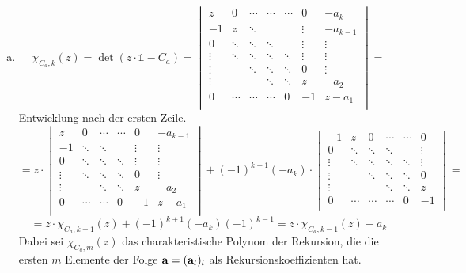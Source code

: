 \begin{enumerate}[(a)]
\item
	\[ \chi_{C_a, k}(z) = \det ( z\cdot \mathds{1} - C_a) = 
		\begin{vmatrix}
			z      & 0      & \cdots & \cdots & \cdots & 0      & -a_k     \\
			-1     & z      & \ddots &        &        & \vdots & -a_{k-1} \\
			0      & \ddots & \ddots & \ddots &        & \vdots & \vdots   \\
			\vdots & \ddots & \ddots & \ddots & \ddots & \vdots & \vdots   \\
			\vdots &        & \ddots & \ddots & \ddots & 0      & \vdots   \\
			\vdots &        &        & \ddots & \ddots & z      & -a_2     \\
			0      & \cdots & \cdots & \cdots & 0      & -1     & z - a_1  \\
		\end{vmatrix} = \]
	Entwicklung nach der ersten Zeile.
	\[ = z \cdot \begin{vmatrix}
			z      & 0      & \cdots & \cdots & 0      & -a_{k-1} \\
			-1     & \ddots & \ddots &        & \vdots & \vdots   \\
			0      & \ddots & \ddots & \ddots & \vdots & \vdots   \\
			\vdots & \ddots & \ddots & \ddots & 0      & \vdots   \\
			\vdots &        & \ddots & \ddots & z      & -a_2     \\
			0      & \cdots & \cdots & 0      & -1     & z - a_1  \\
		\end{vmatrix} + (-1)^{k+1}(-a_k) \cdot
		\begin{vmatrix}
			-1     & z      & 0      & \cdots & \cdots & 0      \\
			0      & \ddots & \ddots & \ddots &        & \vdots \\
			\vdots & \ddots & \ddots & \ddots & \ddots & \vdots \\
			\vdots &        & \ddots & \ddots & \ddots & 0      \\
			\vdots &        &        & \ddots & \ddots & z      \\
			0      & \cdots & \cdots & \cdots & 0      & -1     \\
		\end{vmatrix} = \]
	\[ = z \cdot \chi_{C_a, k-1}(z) + (-1)^{k+1}(-a_k)(-1)^{k-1} = z \cdot \chi_{C_a, k-1}(z) - a_k \]
	Dabei sei $\chi_{C_a, m}(z)$ das charakteristische Polynom der
	Rekursion, die die ersten $m$ Elemente der Folge ${\bf a} = ({\bf
	a}_l)_l$ als Rekursionskoeffizienten hat.


\end{enumerate}
